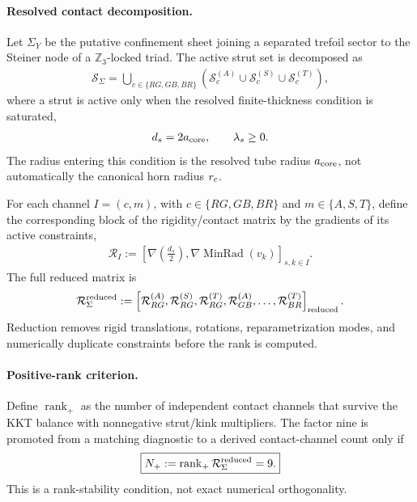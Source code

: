 \paragraph{Resolved contact decomposition.}
Let \(\Sigma_Y\) be the putative confinement sheet joining a separated trefoil
sector to the Steiner node of a \(\mathbb Z_3\)-locked triad.  The active strut set
is decomposed as
\begin{align}
    \mathcal S_{\Sigma}
    =
    \bigcup_{c\in\{RG,GB,BR\}}
    \left(
        \mathcal S_{c}^{(A)}
        \cup
        \mathcal S_{c}^{(S)}
        \cup
        \mathcal S_{c}^{(T)}
    \right),
    \label{eq:rt_colored_strut_decomposition}
\end{align}
where a strut is active only when the resolved finite-thickness condition is
saturated,
\begin{align}
    d_s=2a_{\rm core},
    \qquad
    \lambda_s\ge0.
    \label{eq:rt_rank9_active_strut_condition}
\end{align}
The radius entering this condition is the resolved tube radius
\(a_{\rm core}\), not automatically the canonical horn radius \(r_c\).

For each channel \(I=(c,m)\), with
\(c\in\{RG,GB,BR\}\) and \(m\in\{A,S,T\}\), define the corresponding block of the
rigidity/contact matrix by the gradients of its active constraints,
\begin{align}
    \mathcal R_I
    :=
    \left[
        \nabla\!\left(\frac{d_s}{2}\right),
        \nabla\operatorname{MinRad}(v_k)
    \right]_{s,k\in I}.
    \label{eq:rt_rank9_channel_block}
\end{align}
The full reduced matrix is
\begin{align}
    \mathcal R_{\Sigma}^{\rm reduced}
    :=
    \left[\mathcal R_{RG}^{(A)},\mathcal R_{RG}^{(S)},\mathcal R_{RG}^{(T)},
    \mathcal R_{GB}^{(A)},\ldots,
    \mathcal R_{BR}^{(T)}\right]_{\rm reduced}.
    \label{eq:rt_rank9_reduced_matrix}
\end{align}
Reduction removes rigid translations, rotations, reparametrization modes, and
numerically duplicate constraints before the rank is computed.

\paragraph{Positive-rank criterion.}
Define \(\operatorname{rank}_{+}\) as the number of independent contact channels
that survive the KKT balance with nonnegative strut/kink multipliers.  The
factor nine is promoted from a matching diagnostic to a derived contact-channel
count only if
\begin{align}
    \boxed{
    N_{+}
    :=
    \operatorname{rank}_{+}
    \mathcal R_{\Sigma}^{\rm reduced}
    =9 .
    }
    \label{eq:rt_rank9_positive_rank_condition}
\end{align}
This is a rank-stability condition, not exact numerical orthogonality.

